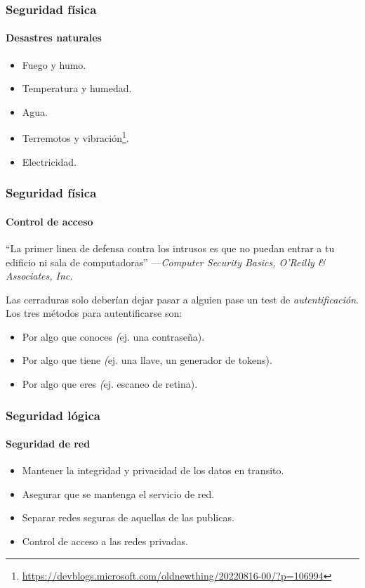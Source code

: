 \documentclass[11pt,a4paper,spanish]{beamer}
\begin{document}
\begin{frame}
    \frametitle{Seguridad física}
    \framesubtitle{Desastres naturales}
    
    \begin{itemize}
        \item Fuego y humo.
        \item Temperatura y humedad.
        \item Agua.
        \item Terremotos y
            vibración\footnote{\url{https://devblogs.microsoft.com/oldnewthing/20220816-00/?p=106994}}.
        \item Electricidad.
    \end{itemize}
\end{frame}

\begin{frame}
    \frametitle{Seguridad física}
    \framesubtitle{Control de acceso}

    ``La primer linea de defensa contra los intrusos es que no puedan entrar a
    tu edificio ni sala de computadoras'' ---\emph{Computer Security Basics,
    O'Reilly \& Associates, Inc.}
    
    Las cerraduras solo deberían dejar pasar a alguien pase un test de
    \emph{autentificación}. Los tres métodos para autentificarse son:
    \begin{itemize}
        \item Por algo que conoces \emph(ej. una contraseña).
        \item Por algo que tiene \emph(ej. una llave, un generador de tokens).
        \item Por algo que eres \emph(ej. escaneo de retina).
    \end{itemize}
\end{frame}

\begin{frame}
    \frametitle{Seguridad lógica}
    \framesubtitle{Seguridad de red}
    
    \begin{itemize}
        \item Mantener la integridad y privacidad de los datos en transito.
        \item Asegurar que se mantenga el servicio de red.
        \item Separar redes seguras de aquellas de las publicas.
        \item Control de acceso a las redes privadas.
    \end{itemize}
\end{frame}
\end{document}
